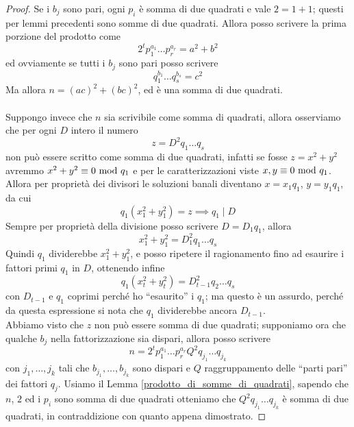 \begin{proof}
	Se i $b_j$ sono pari, ogni $p_i$ è somma di due quadrati e vale $2=1+1$; questi per lemmi precedenti sono somme di due quadrati. Allora posso scrivere la prima porzione del prodotto come
	\begin{equation*}
	2^tp_1^{a_1}\dots p_r^{a_r}=a^2+b^2
	\end{equation*}
	ed ovviamente se tutti i $b_j$ sono pari posso scrivere
	\begin{equation*}
	q_1^{b_1}\dots q_s^{b_s}=c^2
	\end{equation*}
	Ma allora $n=(ac)^2+(bc)^2$, ed è una somma di due quadrati. \\ \\ Suppongo invece che $n$ sia scrivibile come somma di quadrati, allora osserviamo che per ogni $D$ intero il numero
	\begin{equation*}
	z=D^2q_1\dots q_s
	\end{equation*}
	non può essere scritto come somma di due quadrati, infatti se fosse $z=x^2+y^2$ avremmo $x^2+y^2\equiv0\ \mathrm{mod}\ q_1$ e per le caratterizzazioni viste $x,y\equiv0\ \mathrm{mod}\ q_1$. Allora per proprietà dei divisori le soluzioni banali diventano $x=x_1q_1$, $y=y_1q_1$, da cui
	\begin{equation*}
	q_1(x_1^2+y_1^2)=z \implies q_1\mid D
	\end{equation*}
	Sempre per proprietà della divisione posso scrivere $D=D_1q_1$, allora
	\begin{equation*}
	x_1^2+y_1^2=D_1^2q_1\dots q_s
	\end{equation*}
	Quindi $q_1$ dividerebbe $x_1^2+y_1^2$, e posso ripetere il ragionamento fino ad esaurire i fattori primi $q_1$ in $D$, ottenendo infine
	\begin{equation*}
	q_1(x_t^2+y_t^2)=D_{t-1}^2q_2\dots q_s
	\end{equation*}
	con $D_{t-1}$ e $q_1$ coprimi perché ho \enquote{esaurito} i $q_1$; ma questo è un assurdo, perché da questa espressione si nota che $q_1$ dividerebbe ancora $D_{t-1}$.
	\\ Abbiamo visto che $z$ non può essere somma di due quadrati; supponiamo ora che qualche $b_j$ nella fattorizzazione sia dispari, allora posso scrivere
	\begin{equation*}
	n=2^tp_1^{a_1}\dots p_r^{a_r}Q^2q_{j_1}\dots q_{j_k}
	\end{equation*}
	con ${j_1},\dots,{j_k}$ tali che $b_{j_1},\dots,b_{j_k}$ sono dispari e $Q$ raggruppamento delle \enquote{parti pari} dei fattori $q_j$.
	Usiamo il Lemma \ref{prodotto_di_somme_di_quadrati}, sapendo che $n$, $2$ ed i $p_i$ sono somma di due quadrati otteniamo che $Q^2q_{j_1}\dots q_{j_k}$ è somma di due quadrati, in contraddizione con quanto appena dimostrato.
\end{proof}




